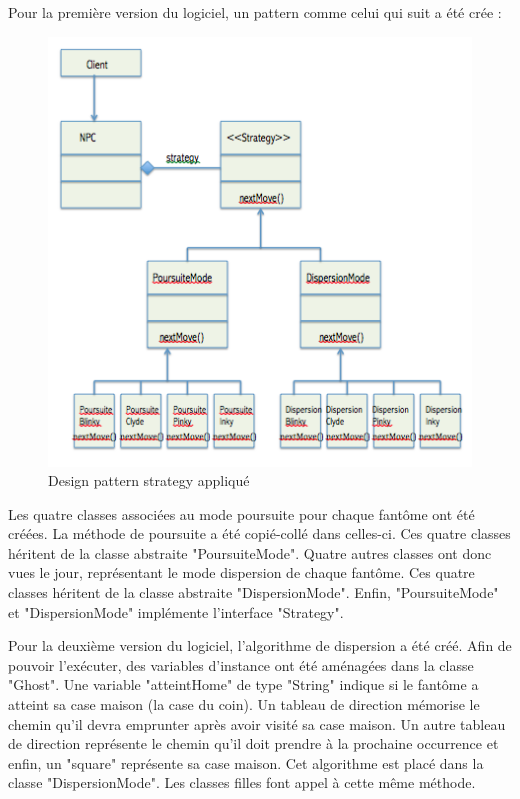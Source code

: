 \documentclass[a4paper,12pt]{report} %
\begin{document}
Pour la première version du logiciel, un pattern comme celui qui suit a été crée :

\begin{figure}[!h] %
		\centering
		\includegraphics[scale=0.9]{ressources/StrategyDP.png}
		\caption{Design pattern strategy appliqué}
\end{figure}
\newpage

Les quatre classes associées au mode poursuite pour chaque fantôme ont été créées. La méthode de poursuite a été copié-collé dans celles-ci. Ces quatre classes héritent de la classe abstraite "PoursuiteMode".
Quatre autres classes ont donc vues le jour, représentant le mode dispersion de chaque fantôme.
Ces quatre classes héritent de la classe abstraite "DispersionMode".
Enfin, "PoursuiteMode" et "DispersionMode" implémente l'interface "Strategy".

Pour la deuxième version du logiciel, l'algorithme de dispersion a été créé.
Afin de pouvoir l'exécuter, des variables d'instance ont été aménagées dans la classe "Ghost". Une variable "atteintHome" de type "String" indique si le fantôme a atteint sa case maison (la case du coin). Un tableau de direction mémorise le chemin qu'il devra emprunter après avoir visité sa case maison. Un autre tableau de direction représente le chemin qu'il doit prendre à la prochaine occurrence et enfin, un "square" représente sa case maison.
Cet algorithme est placé dans la classe "DispersionMode". Les classes filles font appel à cette même méthode.
\end{document}
